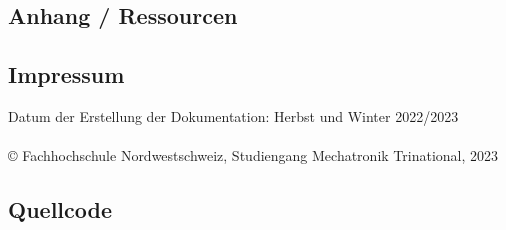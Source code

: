 \begin{appendix} %

\listoffigures
\listoftables

\pagebreak

\section{Anhang / Ressourcen}

\subsection{Impressum}
Datum der Erstellung der Dokumentation: Herbst und Winter 2022/2023\\
\\
© Fachhochschule Nordwestschweiz, Studiengang Mechatronik Trinational, 2023

\subsection{Quellcode}




\end{appendix}
